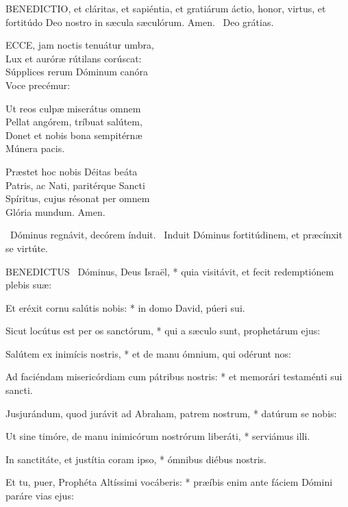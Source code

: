 \lettrine[lines=2]{B}{ENEDICTIO}, et cláritas, et sapiéntia, et gratiárum áctio, honor, virtus, et fortitúdo Deo nostro in sæcula sæculórum. Amen. \R\ Deo grátias.



\lettrine[lines=2]{E}{CCE}, jam noctis tenuátur umbra,\\
Lux et auróræ rútilans corúscat:\\
Súpplices rerum Dóminum canóra\\
Voce precémur:

Ut reos culpæ miserátus omnem\\
Pellat angórem, tríbuat salútem,\\
Donet et nobis bona sempitérnæ\\
Múnera pacis.

Præstet hoc nobis Déitas beáta\\
Patris, ac Nati, paritérque Sancti\\
Spíritus, cujus résonat per omnem\\
Glória mundum. Amen.

\V\ Dóminus regnávit, decórem índuit. \R\ Induit Dóminus fortitúdinem, et præcínxit se virtúte.



\lettrine[lines=2]{B}{ENEDICTUS} \textdagger\ Dóminus, Deus Israël, * quia visitávit, et fecit redemptiónem plebis suæ:

Et eréxit cornu salútis nobis: * in domo David, púeri sui.

Sicut locútus est per os sanctórum, * qui a sæculo sunt, prophetárum ejus:

Salútem ex inimícis nostris, * et de manu ómnium, qui odérunt nos:

Ad faciéndam misericórdiam cum pátribus nostris: * et memorári testaménti sui sancti.

Jusjurándum, quod jurávit ad Abraham, patrem nostrum, * datúrum se nobis:

Ut sine timóre, de manu inimicórum nostrórum liberáti, * serviámus illi.

In sanctitáte, et justítia coram ipso, * ómnibus diébus nostris.

Et tu, puer, Prophéta Altíssimi vocáberis: * præíbis enim ante fáciem Dómini paráre vias ejus:


